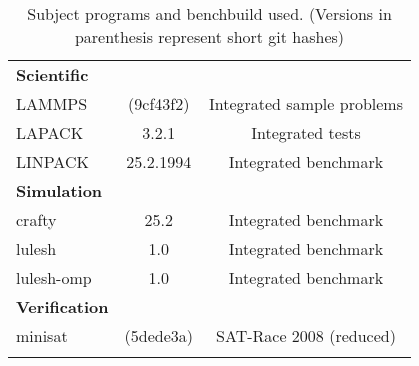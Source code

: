 \begin{longtable}{lcC}
    \midrule
    \textbf{Scientific}\\
    LAMMPS                   & (9cf43f2)               & Integrated sample problems\\
    LAPACK                   & 3.2.1                   & Integrated tests\\
    LINPACK                  & 25.2.1994               & Integrated benchmark\\
    \midrule
    \textbf{Simulation}\\
    crafty                   & 25.2                    & Integrated benchmark\\
    lulesh                   & 1.0                     & Integrated benchmark\\
    lulesh-omp               & 1.0                     & Integrated benchmark\\
    \midrule
    \textbf{Verification}\\
    minisat                  & (5dede3a)               & SAT-Race 2008 (reduced)\\
    \bottomrule
    \caption[Subject programs]{Subject programs and benchbuild used. (Versions in parenthesis represent short git hashes)}
    \label{tab:subjectPrograms}
\end{longtable}
